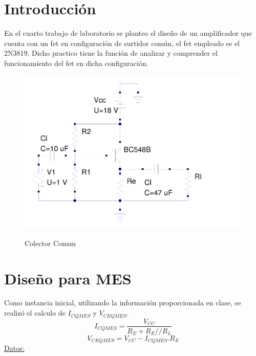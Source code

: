 \documentclass[12pt]{article}
\begin{document}

\tableofcontents
\pagebreak


\section{Introducción}
En el cuarto trabajo de laboratorio se planteo el diseño de un amplificador que cuenta con un fet en configuración de surtidor común, el fet empleado es el 2N3819. Dicho practico tiene la función de analizar y comprender el funcionamiento del fet en dicha configuración.
\begin{figure}[ht]
\centering 
\includegraphics[scale = 0.5]{cc.pdf}\\[0.25 cm]	%
\caption{Colector Comun}
\label{Figura 1}
\end{figure}

\newpage
\section{Diseño para MES}
Como instancia inicial, utilizando la información proporcionada en clase, se realizó el calculo de $I_{CQMES}$ y $V_{CEQMES}$. 
\begin{equation}
\label{ICQMES}
I_{CQMES}=\dfrac{V_{CC}}{R_E+R_E//R_L}
\end{equation}
\begin{equation}
\label{VCEQMES}
V_{CEQMES}=V_{CC}-I_{CQMES}.R_E
\end{equation}
\underline{Datos:}
\end{document}

